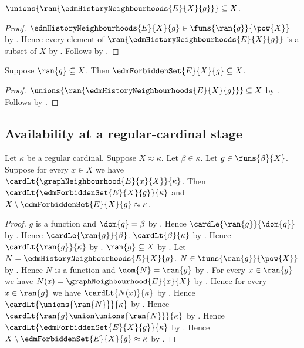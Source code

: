 \begin{proposition}\label{edm_history_neighbourhood_union_subseteq}
    $\unions{\ran{\edmHistoryNeighbourhoods{E}{X}{g}}}
        \subseteq X$.
\end{proposition}
\begin{proof}
    $\edmHistoryNeighbourhoods{E}{X}{g}
        \in\funs{\ran{g}}{\pow{X}}$ by
        .
    Hence every element of
        $\ran{\edmHistoryNeighbourhoods{E}{X}{g}}$ is a subset of $X$ by
        .
    Follows by .
\end{proof}

\begin{proposition}\label{edm_forbidden_set_subseteq}
    Suppose $\ran{g}\subseteq X$.
    Then $\edmForbiddenSet{E}{X}{g}\subseteq X$.
\end{proposition}
\begin{proof}
    $\unions{\ran{\edmHistoryNeighbourhoods{E}{X}{g}}}
        \subseteq X$ by
        .
    Follows by .
\end{proof}

\subsection{Availability at a regular-cardinal stage}

\begin{theorem}\label{edm_regular_stage_available}
    Let $\kappa$ be a regular cardinal.
    Suppose $X\approx\kappa$.
    Let $\beta\in\kappa$.
    Let $g\in\funs{\beta}{X}$.
    Suppose for every $x\in X$ we have
        $\cardLt{\graphNeighbourhood{E}{x}{X}}{\kappa}$.
    Then $\cardLt{\edmForbiddenSet{E}{X}{g}}{\kappa}$ and
        $X\setminus\edmForbiddenSet{E}{X}{g}\approx\kappa$.
\end{theorem}
\begin{proof}
    $g$ is a function and $\dom{g}=\beta$ by
        .
    Hence $\cardLe{\ran{g}}{\dom{g}}$ by
        .
    Hence $\cardLe{\ran{g}}{\beta}$.
    $\cardLt{\beta}{\kappa}$ by .
    Hence $\cardLt{\ran{g}}{\kappa}$ by
        .
    $\ran{g}\subseteq X$ by .
    Let $N=\edmHistoryNeighbourhoods{E}{X}{g}$.
    $N\in\funs{\ran{g}}{\pow{X}}$ by
        .
    Hence $N$ is a function and $\dom{N}=\ran{g}$ by
        .
    For every $x\in\ran{g}$ we have
        $N(x)=\graphNeighbourhood{E}{x}{X}$ by
        .
    Hence for every $x\in\ran{g}$ we have
        $\cardLt{N(x)}{\kappa}$ by .
    Hence $\cardLt{\unions{\ran{N}}}{\kappa}$ by
        .
    Hence $\cardLt{\ran{g}\union\unions{\ran{N}}}{\kappa}$ by
        .
    Hence $\cardLt{\edmForbiddenSet{E}{X}{g}}{\kappa}$ by
        .
    Hence $X\setminus\edmForbiddenSet{E}{X}{g}\approx\kappa$ by
        .
\end{proof}

